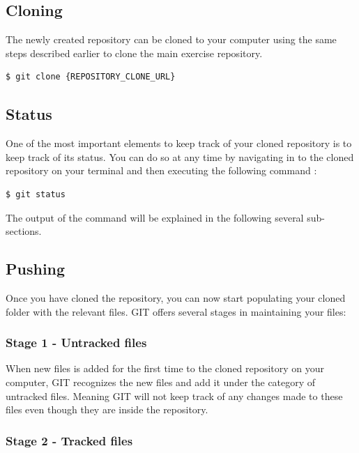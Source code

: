 \documentclass{cmc}
\begin{document}
\subsection{Cloning}
\label{sec:personal-cloning}
The newly created repository can be cloned to your computer using the
same steps described earlier to clone the main exercise repository.

\begin{lstlisting}[language=bash]
$ git clone {REPOSITORY_CLONE_URL}
\end{lstlisting}

\subsection{Status}
\label{sec:personal-status}

One of the most important elements to keep track of your cloned
repository is to keep track of its status. You can do so at any time
by navigating in to the cloned repository on your terminal and then
executing the following command :

\begin{lstlisting}[language=bash]
$ git status
\end{lstlisting}

The output of the command will be explained in the following several
sub-sections.

\subsection{Pushing}
\label{sec:personal_push}

Once you have cloned the repository, you can now start populating your
cloned folder with the relevant files. GIT offers several stages in
maintaining your files:

\subsubsection{Stage 1 - Untracked files}
\label{sec:personal-untracked-files}

When new files is added for the first time to the cloned repository on
your computer, GIT recognizes the new files and add it under the
category of untracked files. Meaning GIT will not keep track of any
changes made to these files even though they are inside the
repository.

\subsubsection{Stage 2 - Tracked files}
\label{sec:stage-2-tracked}
\end{document}
